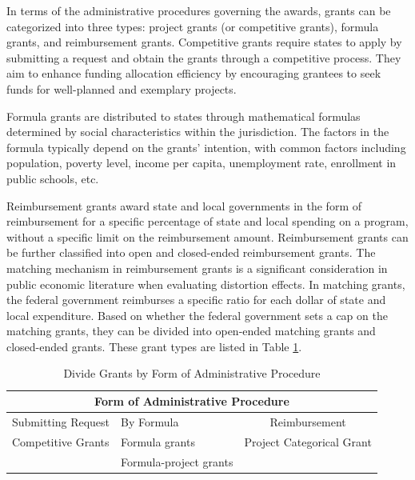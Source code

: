 \documentclass[man]{apa7}
\begin{document}
In terms of the administrative procedures governing the awards, grants can be categorized into three types: project grants (or competitive grants), formula grants, and reimbursement grants. Competitive grants require states to apply by submitting a request and obtain the grants through a competitive process. They aim to enhance funding allocation efficiency by encouraging grantees to seek funds for well-planned and exemplary projects.

Formula grants are distributed to states through mathematical formulas determined by social characteristics within the jurisdiction. The factors in the formula typically depend on the grants' intention, with common factors including population, poverty level, income per capita, unemployment rate, enrollment in public schools, etc.

Reimbursement grants award state and local governments in the form of reimbursement for a specific percentage of state and local spending on a program, without a specific limit on the reimbursement amount. Reimbursement grants can be further classified into open and closed-ended reimbursement grants. The matching mechanism in reimbursement grants is a significant consideration in public economic literature when evaluating distortion effects. In matching grants, the federal government reimburses a specific ratio for each dollar of state and local expenditure. Based on whether the federal government sets a cap on the matching grants, they can be divided into open-ended matching grants and closed-ended grants. These grant types are listed in Table \ref{Table 1.4}.%
\begin{table}[htbp]
  \centering
  \caption{Divide Grants by Form of Administrative Procedure}
  \begin{tabular}{clc}
    \toprule
    \multicolumn{3}{c}{Form of Administrative Procedure}                                                                                                     \\
    \midrule
    \multicolumn{1}{p{9.645em}}{ Submitting Request} & \multicolumn{1}{p{10.285em}}{               By Formula} & \multicolumn{1}{p{10.855em}}{Reimbursement} \\
    \midrule
    \multicolumn{1}{l}{Competitive Grants}           & Formula grants                                          & Project Categorical Grant                   \\
                                                     & Formula-project grants                                  &                                             \\
    \bottomrule
  \end{tabular}%
  \label{Table 1.4}%
\end{table}%
\end{document}
